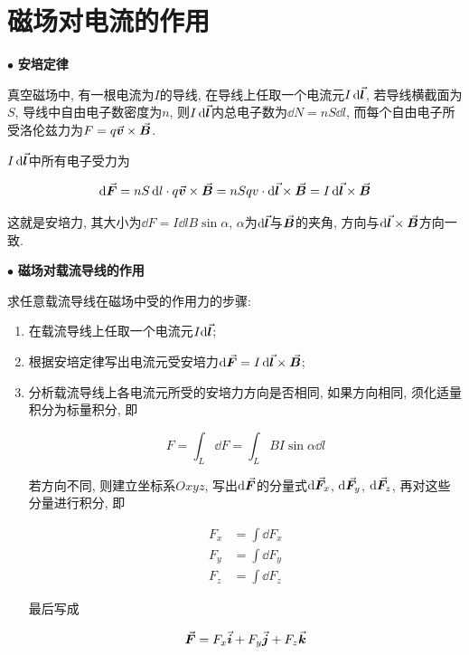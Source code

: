 \section{磁场对电流的作用}\label{8.5}

$\bullet$ \textbf{安培定律}

\begin{axiom}[安培定律]
	
	真空磁场中, 有一根电流为$I$的导线, 在导线上任取一个电流元$I\dd{\va*{l}}$, 若导线横截面为$S$, 导线中自由电子数密度为$n$, 则$I\dd{\va*{l}}$内总电子数为$\dd{N} = nS\dd{l}$, 而每个自由电子所受洛伦兹力为$F = q\va*{v} \times \va*{B}$. 
	
	$I\dd{\va*{l}}$中所有电子受力为
	
	\begin{equation}
		\dd{\va*{F}} = nS\dd{l} \cdot q\va*{v} \times \va*{B} = nSqv \cdot \dd{\va*{l}} \times \va*{B} = I\dd{\va*{l}} \times \va*{B} \label{C8-eq15}
	\end{equation}
	
	这就是安培力, 其大小为$\dd{F} = I \dd{l} B \sin \alpha$, $\alpha$为$\dd\va*{l}$与$\va*{B}$的夹角, 方向与$\dd\va*{l} \times \va*{B}$方向一致. 
	
\end{axiom}

$\bullet$ \textbf{磁场对载流导线的作用}

求任意载流导线在磁场中受的作用力的步骤: 

\begin{enumerate}[itemindent=1em]
	
	\item 在载流导线上任取一个电流元$I\dd\va*{l}$;
	
	\item 根据安培定律写出电流元受安培力$\dd{\va*{F}} = I\dd{\va*{l}} \times \va*{B}$;
	
	\item 分析载流导线上各电流元所受的安培力方向是否相同, 如果方向相同, 须化适量积分为标量积分, 即
	
	\begin{equation*}
		F = \int_{L} \dd{F} = \int_{L} BI\sin\alpha \dd{l}
	\end{equation*}
	
	若方向不同, 则建立坐标系$Oxyz$, 写出$\dd{\va*{F}}$的分量式$\dd{\va*{F}_x}$, $\dd{\va*{F}_y}$, $\dd{\va*{F}_z}$, 再对这些分量进行积分, 即
	
	\begin{align*}
		F_x &= \int \dd{F_x} \\
		F_y &= \int \dd{F_y} \\
		F_z &= \int \dd{F_z}
	\end{align*}
	
	最后写成
	
	\begin{equation*}
		\va*{F} = F_x \va*{i} + F_y \va*{j} + F_z \va*{k}
	\end{equation*}
	
\end{enumerate}

